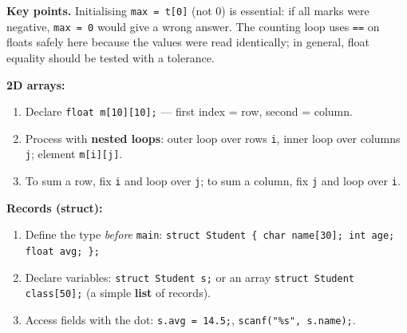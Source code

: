 \documentclass[11pt]{article}
\begin{document}
\begin{exoresolu}
\textbf{Key points.} Initialising \texttt{max = t[0]} (not $0$) is essential: if all marks were negative, \texttt{max = 0} would give a wrong answer. The counting loop uses \texttt{==} on floats safely here because the values were read identically; in general, float equality should be tested with a tolerance.
\end{exoresolu}

\begin{methode}
\textbf{2D arrays:}
\begin{enumerate}
\item Declare \texttt{float m[10][10];} — first index = row, second = column.
\item Process with \textbf{nested loops}: outer loop over rows \texttt{i}, inner loop over columns \texttt{j}; element \texttt{m[i][j]}.
\item To sum a row, fix \texttt{i} and loop over \texttt{j}; to sum a column, fix \texttt{j} and loop over \texttt{i}.
\end{enumerate}
\textbf{Records (struct):}
\begin{enumerate}
\item Define the type \emph{before} \texttt{main}: \texttt{struct Student \{ char name[30]; int age; float avg; \};}
\item Declare variables: \texttt{struct Student s;} or an array \texttt{struct Student class[50];} (a simple \textbf{list} of records).
\item Access fields with the dot: \texttt{s.avg = 14.5;}, \texttt{scanf("\%s", s.name);}.
\end{enumerate}
\end{methode}
\end{document}
